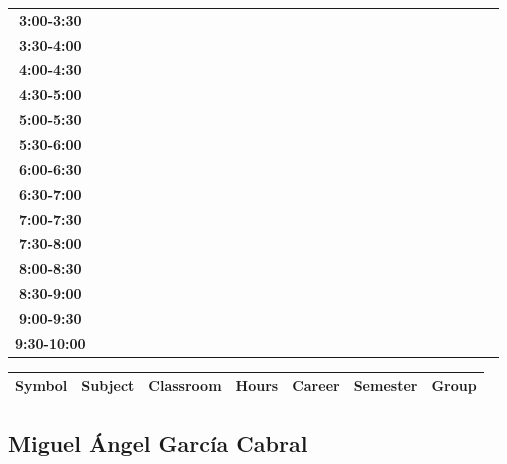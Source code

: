 \documentclass{article}
\begin{document}
\begin{table}[ht]
\begin{tabular}{|c|c|c|c|c|c|c|c|c|c|c|c|c|c|c|c|c|c|c|c|c|c|c|c|c|c|c|c|c|c|}
\textbf{3:00-3:30} &   &   &   &   &   &   &   \\
 \cline{1-8} 
\textbf{3:30-4:00} &   &   &   &   &   &   &   \\
 \cline{1-8} 
\textbf{4:00-4:30} &   &   &   &   &   &   &   \\
 \cline{1-8} 
\textbf{4:30-5:00} &   &   &   &   &   &   &   \\
 \cline{1-8} 
\textbf{5:00-5:30} &   &   &   &   &   &   &   \\
 \cline{1-8} 
\textbf{5:30-6:00} &   &   &   &   &   &   &   \\
 \cline{1-8} 
\textbf{6:00-6:30} &   &   &   &   &   &   &   \\
 \cline{1-8} 
\textbf{6:30-7:00} &   &   &   &   &   &   &   \\
 \cline{1-8} 
\textbf{7:00-7:30} &   &   &   &   &   &   &   \\
 \cline{1-8} 
\textbf{7:30-8:00} &   &   &   &   &   &   &   \\
 \cline{1-8} 
\textbf{8:00-8:30} &   &   &   &   &   &   &   \\
 \cline{1-8} 
\textbf{8:30-9:00} &   &   &   &   &   &   &   \\
 \cline{1-8} 
\textbf{9:00-9:30} &   &   &   &   &   &   &   \\
 \cline{1-8} 
\textbf{9:30-10:00} &   &   &   &   &   &   &   \\
 \cline{1-8} 
\end{tabular}\end{table}

        
        \begin{tabular}{|>{\centering\arraybackslash}m{2cm}|>{\centering\arraybackslash}m{4cm}|>{\centering\arraybackslash}m{2cm}|>{\centering\arraybackslash}m{2cm}|>{\centering\arraybackslash}m{2cm}|>{\centering\arraybackslash}m{2cm}|>{\centering\arraybackslash}m{2cm}|}
        \hline
        \textbf{Symbol} & \textbf{Subject} & \textbf{Classroom} & \textbf{Hours} & \textbf{Career} & \textbf{Semester} & \textbf{Group} \\
        \hline
        \end{tabular}
                    

        \newpage
        

        \subsection{Miguel \'Angel Garc\'ia Cabral}
        \vspace*{.1cm}
        
\end{document}
